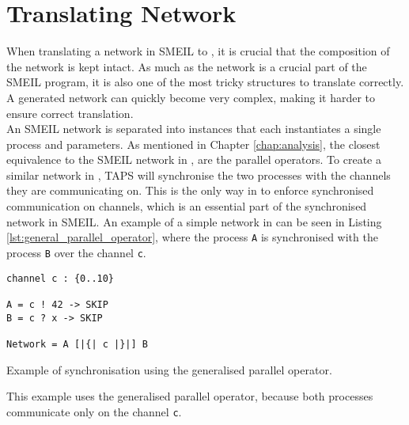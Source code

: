 \section{Translating Network}
\label{sec:design_translating_network}
When translating a network in SMEIL to \cspm{}, it is crucial that the composition of the network is kept intact. As much as the network is a crucial part of the SMEIL program, it is also one of the most tricky structures to translate correctly. A generated network can quickly become very complex, making it harder to ensure correct translation. \\

An SMEIL network is separated into instances that each instantiates a single process and parameters. As mentioned in Chapter \ref{chap:analysis}, the closest equivalence to the SMEIL network in \cspm{}, are the parallel operators. To create a similar network in \cspm{}, TAPS will synchronise the two processes with the channels they are communicating on.
This is the only way in \cspm{} to enforce synchronised communication on channels, which is an essential part of the synchronised network in SMEIL. An example of a simple network in \cspm{} can be seen in Listing \ref{lst:general_parallel_operator}, where the process \texttt{A} is synchronised with the process \texttt{B} over the channel \texttt{c}.
\begin{listing}
\begin{verbatim}
channel c : {0..10}

A = c ! 42 -> SKIP
B = c ? x -> SKIP

Network = A [|{| c |}|] B
\end{verbatim}
\caption{Example of synchronisation using the generalised parallel operator.}
\label{lst:general_parallel_operator}
\end{listing}
This example uses the generalised parallel operator, because both processes communicate only on the channel \texttt{c}.

